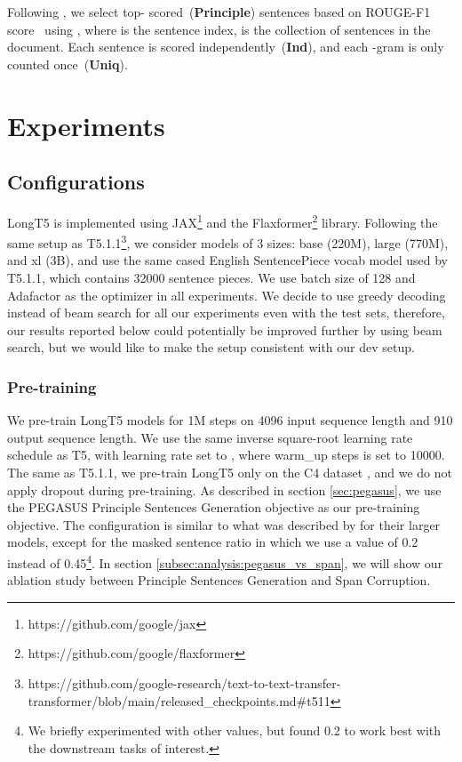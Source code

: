 \documentclass[11pt]{article}
\begin{document}
Following \citet{pegasus}, we select top- scored~(\textbf{Principle}) sentences based on ROUGE-F1 score~\cite{lin-2004-rouge} using ,
where  is the sentence index,  is the collection of sentences in the document.
Each sentence is scored independently~(\textbf{Ind}), and each -gram is only counted once~(\textbf{Uniq}).



\section{Experiments}\label{sec:experiments}
\subsection{Configurations}
LongT5 is implemented using JAX\footnote{https://github.com/google/jax} and the Flaxformer\footnote{https://github.com/google/flaxformer} library. Following the same setup as T5.1.1\footnote{https://github.com/google-research/text-to-text-transfer-transformer/blob/main/released\_checkpoints.md\#t511}, we consider models of 3 sizes: base (220M), large (770M), and xl (3B), 
and use the same cased English SentencePiece vocab model used by T5.1.1, which contains 32000 sentence pieces. We use batch size of 128 and Adafactor as the optimizer in all experiments. We decide to use greedy decoding instead of beam search for all our experiments even with the test sets, therefore, our results reported below could potentially be improved further by using beam search, but we would like to make the setup consistent with our dev setup.

\subsubsection{Pre-training}
We pre-train LongT5 models for 1M steps on 4096 input sequence length and 910 output sequence length. We use the same inverse square-root learning rate schedule as T5, with learning rate set to , where warm\_up steps is set to 10000. The same as T5.1.1, we pre-train LongT5 only on the C4 dataset \cite{c4}, and we do not apply dropout during pre-training. As described in section \ref{sec:pegasus}, we use the PEGASUS Principle Sentences Generation objective as our pre-training objective. The configuration is similar to what was described by  for their larger models, except for the masked sentence ratio in which we use a value of 0.2 instead of 0.45\footnote{We briefly experimented with other values, but found 0.2 to work best with the downstream tasks of interest.}. In section \ref{subsec:analysis:pegasus_vs_span}, we will show our ablation study between Principle Sentences Generation and Span Corruption.
\end{document}
